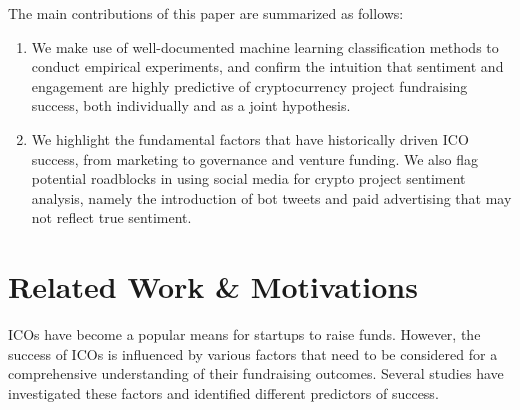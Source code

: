 \documentclass[runningheads]{llncs}
\begin{document}
The main contributions of this paper are summarized as follows:
\begin{enumerate}
    \item We make use of well-documented machine learning classification methods to conduct empirical experiments, and confirm the intuition that sentiment and engagement are highly predictive of cryptocurrency project fundraising success, both individually and as a joint hypothesis.
    \item We highlight the fundamental factors that have historically driven ICO success, from marketing to governance and venture funding. We also flag potential roadblocks in using social media for crypto project sentiment analysis, namely the introduction of bot tweets and paid advertising that may not reflect true sentiment.
\end{enumerate}


\section{Related Work \& Motivations}
ICOs have become a popular means for startups to raise funds. However, the success of ICOs is influenced by various factors that need to be considered for a comprehensive understanding of their fundraising outcomes. Several studies have investigated these factors and identified different predictors of success.


\end{document}
